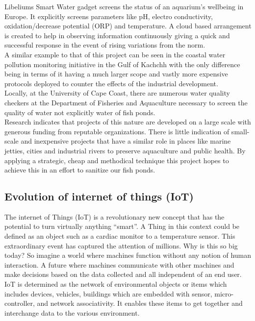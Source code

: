 \documentclass[12pt]{article}
\begin{document}
		Libeliums Smart Water gadget screens the status of an aquarium's wellbeing in Europe. It explicitly screens parameters like pH, electro conductivity, oxidation/decrease potential (ORP) and temperature. A cloud based arrangement is created to help in observing information continuously giving a quick and successful response in the event of rising variations from the norm. \\
		
		A similar example to that of this project can be seen in the coastal water pollution monitoring initiative in the Gulf of Kachchh with the only difference being in terms of it having a much larger scope and vastly more expensive protocols deployed to counter the effects of the industrial development.	\\
		
		Locally, at the University of Cape Coast, there are numerous water quality checkers at the Department of Fisheries and Aquaculture necessary to screen the quality of water not explicitly water of fish ponds. \\
		
		Research indicates that projects of this nature are developed on a large scale with generous funding from reputable organizations. There is little indication of small-scale and inexpensive projects that have a similar role in places like marine jetties, cities and industrial rivers to preserve aquaculture and public health. By applying a strategic, cheap and methodical technique this project hopes to achieve this in an effort to sanitize our fish ponds.
		
		\subsection*{Evolution of internet of things (IoT)}
			The internet of Things (IoT) is a revolutionary new concept that has the potential to turn virtually anything “smart”. A Thing in this context could be defined as an object such as a cardiac monitor to a temperature sensor. This extraordinary event has captured the attention of millions. Why is this so big today? So imagine a world where machines function without any notion of human interaction. A future where machines communicate with other machines and make decisions based on the data collected and all independent of an end user. IoT is determined as the network of environmental objects or items which includes devices, vehicles, buildings which are embedded with sensor, micro-controller, and network associativity. It enables these items to get together and interchange data to the various environment. \\
			
\end{document}
